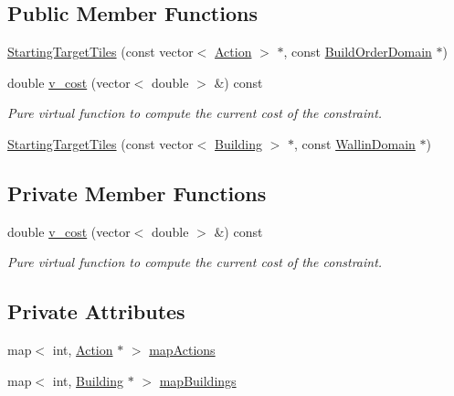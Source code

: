 \subsection*{Public Member Functions}
\begin{DoxyCompactItemize}
\item 
\hyperlink{classghost_1_1StartingTargetTiles_a1b4b7834fdd5b1dd7eef0ef5650a1862}{Starting\-Target\-Tiles} (const vector$<$ \hyperlink{classghost_1_1Action}{Action} $>$ $\ast$, const \hyperlink{classghost_1_1BuildOrderDomain}{Build\-Order\-Domain} $\ast$)
\item 
double \hyperlink{classghost_1_1StartingTargetTiles_aa9474c7fb81691a2059d2e5614702544}{v\-\_\-cost} (vector$<$ double $>$ \&) const 
\begin{DoxyCompactList}\small\item\em Pure virtual function to compute the current cost of the constraint. \end{DoxyCompactList}\item 
\hyperlink{classghost_1_1StartingTargetTiles_a6c2b6cf28fb668cfe7909396679d2587}{Starting\-Target\-Tiles} (const vector$<$ \hyperlink{classghost_1_1Building}{Building} $>$ $\ast$, const \hyperlink{classghost_1_1WallinDomain}{Wallin\-Domain} $\ast$)
\end{DoxyCompactItemize}
\subsection*{Private Member Functions}
\begin{DoxyCompactItemize}
\item 
double \hyperlink{classghost_1_1StartingTargetTiles_aa9474c7fb81691a2059d2e5614702544}{v\-\_\-cost} (vector$<$ double $>$ \&) const 
\begin{DoxyCompactList}\small\item\em Pure virtual function to compute the current cost of the constraint. \end{DoxyCompactList}\end{DoxyCompactItemize}
\subsection*{Private Attributes}
\begin{DoxyCompactItemize}
\item 
map$<$ int, \hyperlink{classghost_1_1Action}{Action} $\ast$ $>$ \hyperlink{classghost_1_1StartingTargetTiles_a09044317698eebe778e8c5eeb3e58ff2}{map\-Actions}
\item 
map$<$ int, \hyperlink{classghost_1_1Building}{Building} $\ast$ $>$ \hyperlink{classghost_1_1StartingTargetTiles_a08e51275da85bfaa8a108976cbd133e2}{map\-Buildings}
\end{DoxyCompactItemize}
